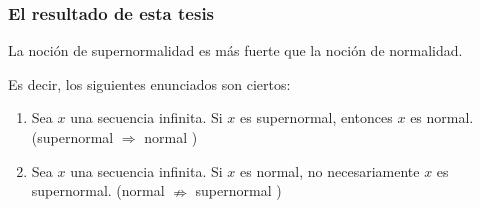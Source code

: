 \documentclass[10pt,mathserif]{beamer}%
\begin{document}
\begin{frame}
  \frametitle{El resultado de esta tesis}
  
  \begin{theorem}
    La noción de supernormalidad es más fuerte que la noción de normalidad.

    Es decir, los siguientes enunciados son ciertos:
    \begin{enumerate}
      \item Sea $x$ una secuencia infinita. Si $x$ es supernormal, entonces $x$ es normal. (supernormal $\Rightarrow$ normal )
      \item Sea $x$ una secuencia infinita. Si $x$ es normal, no necesariamente  $x$ es supernormal. (normal $\nRightarrow$ supernormal )
    \end{enumerate}
  \end{theorem}


\end{frame}
\end{document}
